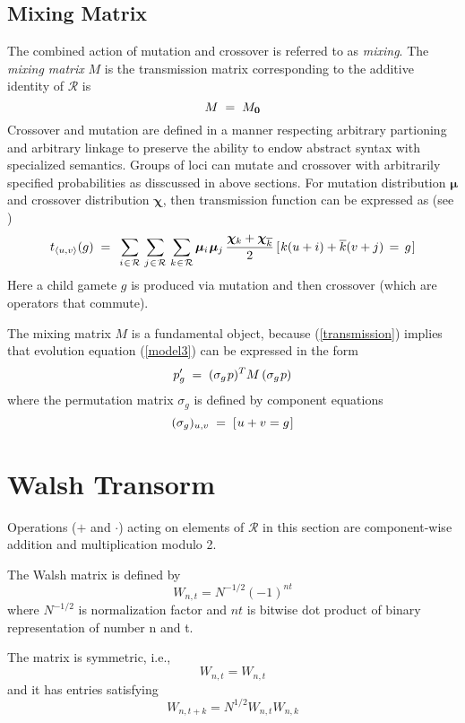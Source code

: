 \subsection{Mixing Matrix}
The combined action of mutation and crossover is referred to as {\em mixing}.
The {\em mixing matrix\/} $M$ is the transmission matrix corresponding to the 
additive identity of $\mathcal{R}$ is
\[
M \; = \; M_{\bf 0}\\[-0.01in]
\]
Crossover and mutation are defined in a manner respecting arbitrary partioning and arbitrary linkage to preserve the ability to endow abstract syntax with specialized semantics. Groups of loci can mutate and crossover with arbitrarily specified probabilities as disscussed in above sections. For mutation distribution $\bm{\mu}$ and crossover distribution $\bm{\chi}$, then transmission function can be expressed as (see \cite{VoseWright1998})
\begin{equation}
\label{transmission}
t_{\langle u,v \rangle}(g) \; = \;\,
\sum_{i \hspace{0.01in} \in \hspace{0.01in} \mathcal{R}} \, \sum_{j \hspace{0.01in} \in \hspace{0.01in} \mathcal{R}} \,
\sum_{k \hspace{0.01in} \in \hspace{0.01in} \mathcal{R}}
\bm{\mu}_i \hspace{0.01in} \bm{\mu}_j \, \frac{\bm{\chi}_k + \bm{\chi}_{\overline{k}}}{2} \,
[\hspace{0.01in} k (u + i) + \overline{k}(v + j) \, = \, g\hspace{0.01in}]
\end{equation}
Here a child gamete $g$ is produced via mutation and then crossover (which are operators that
commute). 

The mixing matrix $M$ is a fundamental object, because (\ref{transmission}) implies that evolution equation (\ref{model3}) can be expressed in the form
\begin{equation}
\label{model4}
p_g^\prime \; = \; (\sigma_g \hspace{0.01in} p)^T M \, (\sigma_g \hspace{0.01in} p)
\end{equation}
where the permutation matrix $\sigma_g$ is defined by component equations
\[
(\sigma_g)_{u,v} \; = \; [\hspace{0.01in} u+v = g\hspace{0.01in} ]
\]

\section{Walsh Transorm}
Operations ($+$ and $\cdot$) acting on elements of $\mathcal{R}$ in this section are component-wise addition and multiplication modulo 2. 

The Walsh matrix is defined by
\[
W_{n,t} = N^{-1/2} (-1)^{n t}
\]
where $N^{-1/2}$ is normalization factor and $n t$ is bitwise dot product of binary representation of number n and t.

The matrix is symmetric, i.e.,
\[
W_{n,t} = W_{n,t}
\]
and it has entries satisfying
\[
W_{n, t + k} = N^{1/2} W_{n, t} W_{n, k}
\]

